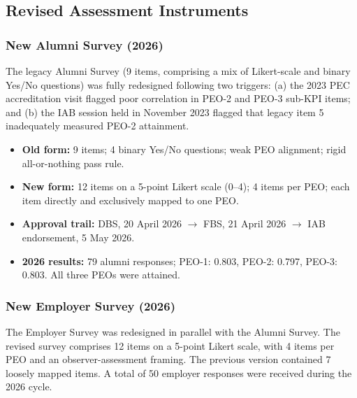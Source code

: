 \hypertarget{Revised-Assessment-Instruments}{%
\subsection{Revised Assessment Instruments}\label{revised-assesment-instrument}}

\subsubsection{New Alumni Survey (2026)}
The legacy Alumni Survey (9 items, comprising a mix of Likert-scale
and binary Yes/No questions) was fully redesigned following two triggers:
(a) the 2023 PEC accreditation visit flagged poor correlation in PEO-2
and PEO-3 sub-KPI items; and (b) the IAB session held in November 2023
flagged that legacy item 5 inadequately measured PEO-2 attainment.

\begin{itemize}[noitemsep, topsep=0pt]
    \item \textbf{Old form:} 9 items; 4 binary Yes/No questions;
    weak PEO alignment; rigid all-or-nothing pass rule.

    \item \textbf{New form:} 12 items on a 5-point Likert scale (0--4);
    4 items per PEO; each item directly and exclusively mapped to one PEO.

    \item \textbf{Approval trail:} DBS, 20 April 2026
    $\rightarrow$ FBS, 21 April 2026
    $\rightarrow$ IAB endorsement, 5 May 2026.

    \item \textbf{2026 results:} 79 alumni responses;
    PEO-1: 0.803, PEO-2: 0.797, PEO-3: 0.803.
    All three PEOs were attained.
\end{itemize}

\subsubsection{New Employer Survey (2026)}
The Employer Survey was redesigned in parallel with the Alumni Survey.
The revised survey comprises 12 items on a 5-point Likert scale, with
4 items per PEO and an observer-assessment framing. The previous
version contained 7 loosely mapped items. A total of 50 employer
responses were received during the 2026 cycle.

